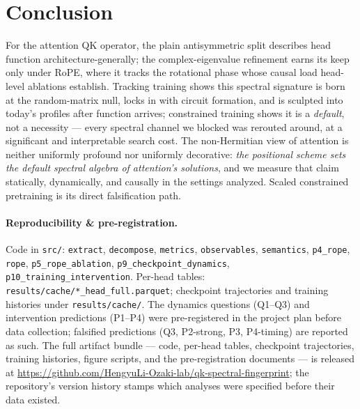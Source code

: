 \documentclass[11pt]{article}
\newcommand{\Rope}{RoPE\xspace}
\begin{document}
\section{Conclusion}
For the attention QK operator, the plain antisymmetric split describes head function architecture-generally; the
complex-eigenvalue refinement earns its keep only under \Rope, where it tracks the rotational phase whose causal
load head-level ablations establish. Tracking training shows this spectral signature is born at the random-matrix null, locks in with circuit
formation, and is sculpted into today's profiles after function arrives; constrained training shows it is a
\emph{default}, not a necessity --- every spectral channel we blocked was rerouted around, at a significant and
interpretable search cost. The non-Hermitian view of attention is neither uniformly profound nor uniformly
decorative: \emph{the positional scheme sets the default spectral algebra of attention's solutions}, and we
measure that claim statically, dynamically, and causally in the settings analyzed. Scaled constrained pretraining
is its direct falsification path.

\paragraph{Reproducibility \& pre-registration.}\sloppy Code in \texttt{src/}: \texttt{extract}, \texttt{decompose},
\texttt{metrics}, \texttt{observables}, \texttt{semantics}, \texttt{p4\_rope}, \texttt{rope},
\texttt{p5\_rope\_ablation}, \texttt{p9\_checkpoint\_dynamics}, \texttt{p10\_training\_intervention}. Per-head
tables: \texttt{results/cache/*\_head\_full.parquet}; checkpoint trajectories and training histories under
\texttt{results/cache/}. The dynamics questions (Q1--Q3) and intervention predictions (P1--P4) were pre-registered
in the project plan before data collection; falsified predictions (Q3, P2-strong, P3, P4-timing) are reported as
such. The full artifact bundle --- code, per-head tables, checkpoint trajectories, training histories, figure
scripts, and the pre-registration documents --- is released at
\url{https://github.com/HengyuLi-Ozaki-lab/qk-spectral-fingerprint}; the repository's version history stamps
which analyses were specified before their data existed.



\end{document}
